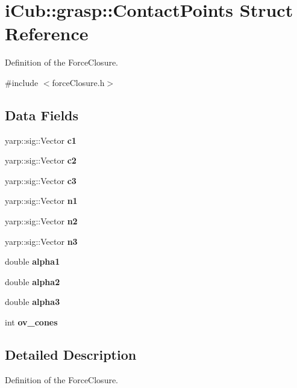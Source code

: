 \section{i\+Cub\+:\+:grasp\+:\+:Contact\+Points Struct Reference}
\label{structiCub_1_1grasp_1_1ContactPoints}


Definition of the Force\+Closure.  




{\ttfamily \#include $<$force\+Closure.\+h$>$}

\subsection*{Data Fields}
\begin{DoxyCompactItemize}
\item 
\label{structiCub_1_1grasp_1_1ContactPoints_aa6ce776737a5b4b31843fe207068ae6f} 
yarp\+::sig\+::\+Vector {\bfseries c1}
\item 
\label{structiCub_1_1grasp_1_1ContactPoints_ae99dea754916c00b09ce7b5363724b51} 
yarp\+::sig\+::\+Vector {\bfseries c2}
\item 
\label{structiCub_1_1grasp_1_1ContactPoints_ae781f84ef5e47006ac055b439939c22a} 
yarp\+::sig\+::\+Vector {\bfseries c3}
\item 
\label{structiCub_1_1grasp_1_1ContactPoints_a2da07ce7a54c3bcda2968aefbaddd6ca} 
yarp\+::sig\+::\+Vector {\bfseries n1}
\item 
\label{structiCub_1_1grasp_1_1ContactPoints_a1fb1b04a6fa25f1d480e3cdb770d23d7} 
yarp\+::sig\+::\+Vector {\bfseries n2}
\item 
\label{structiCub_1_1grasp_1_1ContactPoints_a5271cce9c612d6cb1a91ee91be2ab945} 
yarp\+::sig\+::\+Vector {\bfseries n3}
\item 
\label{structiCub_1_1grasp_1_1ContactPoints_aa178bc34a5b13366a2b23b9345543023} 
double {\bfseries alpha1}
\item 
\label{structiCub_1_1grasp_1_1ContactPoints_a49b5e34d24c83e7107b24462121ee133} 
double {\bfseries alpha2}
\item 
\label{structiCub_1_1grasp_1_1ContactPoints_a49e2797c4be9fca7d15114c5f3a85e4c} 
double {\bfseries alpha3}
\item 
\label{structiCub_1_1grasp_1_1ContactPoints_a8c4a117cf0b4729257df2826f2c5ac2d} 
int {\bfseries ov\+\_\+cones}
\end{DoxyCompactItemize}


\subsection{Detailed Description}
Definition of the Force\+Closure. 

